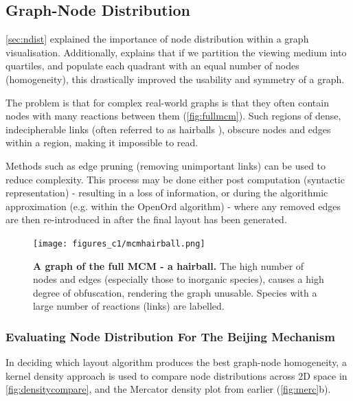 \subsection{Graph-Node Distribution}\label{sec:nodedist}

\autoref{sec:ndist} explained the importance of node distribution within a graph visualisation. Additionally, \cite{ch6graphredability} explains that if we partition the viewing medium into quartiles, and populate each quadrant with an equal number of nodes (homogeneity), this drastically improved the usability and symmetry of a graph.

The problem is that for complex real-world graphs is that they often contain nodes with many reactions between them (\autoref{fig:fullmcm}). Such regions of dense, indecipherable links (often referred to as hairballs \citep{vislarge}), obscure nodes and edges within a region, making it impossible to read.

Methods such as edge pruning \citep{edgeprune} (removing unimportant links) can be used to reduce complexity. This process may be done either post computation (syntactic representation) - resulting in a loss of information, or during the algorithmic approximation (e.g. within the OpenOrd algorithm) - where any removed edges are then re-introduced in after the final layout has been generated.


\begin{figure}[H]
     \centering
     \texttt{[image: figures\_c1/mcmhairball.png]}
        \caption{\textbf{A graph of the full MCM - a hairball.} The high number of nodes and edges (especially those to inorganic species), causes a high degree of obfuscation, rendering the graph unusable. Species with a large number of reactions (links) are labelled.}
        \label{fig:fullmcm}
\end{figure}

\subsubsection{Evaluating Node Distribution For The Beijing Mechanism}\label{sec:evalnd}


In deciding which layout algorithm produces the best graph-node homogeneity, a kernel density approach is used to compare node distributions across 2D space in \autoref{fig:densitycompare}, and the Mercator density plot from earlier (\autoref{fig:merc}b). 

